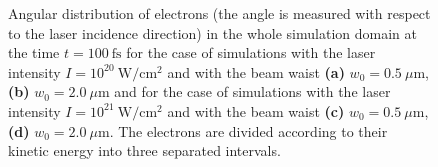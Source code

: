 \begin{figure}[h!]
	\caption{Angular distribution of electrons (the angle is measured with respect to the laser incidence direction) in the whole simulation domain at the time $ t = 100 \ \mathrm{fs} $ for the case of simulations with the laser intensity $ I = 10^{20} \ \mathrm{W/cm^2} $ and with the beam waist \textbf{(a)} $ w_0 = 0.5 \ \mu\mathrm{m} $, \textbf{(b)} $ w_0 = 2.0 \ \mu\mathrm{m} $ and for the case of simulations with the laser intensity $ I = 10^{21} \ \mathrm{W/cm^2} $ and with the beam waist \textbf{(c)} $ w_0 = 0.5 \ \mu\mathrm{m} $, \textbf{(d)} $ w_0 = 2.0 \ \mu\mathrm{m} $. The electrons are divided according to their kinetic energy into three separated intervals.}
	\label{fig:13}
\end{figure}

\begin{figure}[h!]
	\centering
	\hspace{1mm}
	\\[2mm]

\end{figure}
